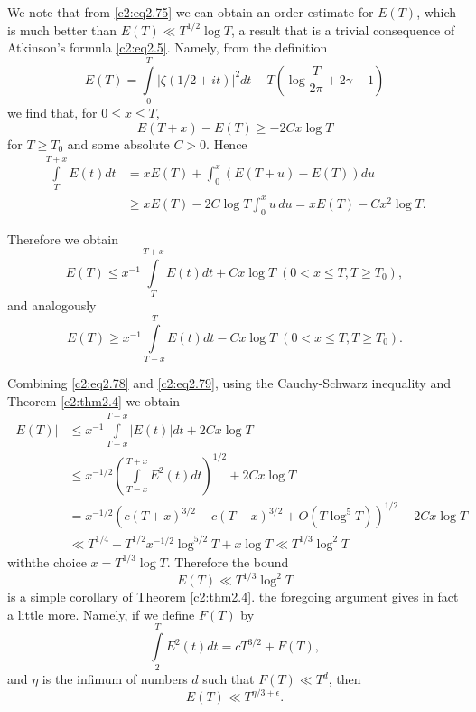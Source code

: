 We note that from \eqref{c2:eq2.75} we can obtain an order estimate
for $E(T)$, which is much better than $E(T) \ll T^{1/2}\log T$, a
result that is a trivial consequence of Atkinson's formula
\eqref{c2:eq2.5}. Namely, from the definition
$$
E(T) = \int\limits_0^T |\zeta (1/2 + it)|^2 dt - T \left(\log
\frac{T}{2 \pi} + 2 \gamma -1 \right)
$$
we find that, for $0\leq x \leq T$,
\begin{equation}
  E(T+x) - E(T) \geq - 2 Cx \log T\label{c2:eq2.77}
\end{equation}
for $T \geq T_0$ and some absolute $C> 0$. Hence
\begin{align*}
  \int\limits_T^{T+x} E(t) dt & = x E (T) + \int_0^x (E(T+ u)- E
  (T))du\\
  & \geq x E(T) - 2 C \log T \int_0^x u \, du = x E(T) - Cx^2 \log T.
\end{align*}

Therefore we obtain
\begin{equation}
  E(T) \leq x^{-1} \int\limits_T^{T+x} E(t) dt + Cx \log T \;  (0 < x \leq
  T, T \geq T_0),\label{c2:eq2.78}
\end{equation}
and analogously
\begin{equation}
  E(T) \geq x^{-1} \int\limits^T_{T-x} E(t) dt - Cx \log T \; (0 < x \leq
  T, T \geq T_0).\label{c2:eq2.79}
\end{equation}

Combining \eqref{c2:eq2.78} and \eqref{c2:eq2.79}, using the
Cauchy-Schwarz inequality and Theorem \ref{c2:thm2.4} we obtain
\begin{align*}
  |E(T)| &\leq x^{-1} \int\limits_{T-x}^{T+x} |E (t) |dt + 2 Cx \log
  T\\
  & \leq x^{-1/2} \left(\int\limits_{T-x}^{T+x} E^2 (t) dt
  \right)^{1/2} + 2 C x \log T\\
  & = x^{-1/2} (c(T + x)^{3/2}- c(T- x)^{3/2} + O(T \log^5 T))^{1/2} +
  2 C x \log T\\
  & \ll T^{1/4} + T^{1/2} x^{- 1/2} \log^{5/2}T + x \log T \ll T^{1/3}
  \log^2 T
\end{align*}
with\pageoriginale the choice $x= T^{1/3} \log T$. Therefore the bound
\begin{equation}
  E(T) \ll T^{1/3} \log^2 T \label{c2:eq2.80}
\end{equation}
is a simple corollary of Theorem \ref{c2:thm2.4}. the foregoing
argument gives in fact a little more. Namely, if we define $F(T)$ by 
\begin{equation}
  \int\limits_2^T E^2 (t) dt = c T^{3/2} + F(T),\label{c2:eq2.81}
\end{equation}
and $\eta$ is the infimum of numbers $d$ such that $F(T) \ll T^d$,
then 
\begin{equation}
  E(T) \ll T^{\eta/3 + \epsilon}. \label{c2:eq2.82}
\end{equation}

